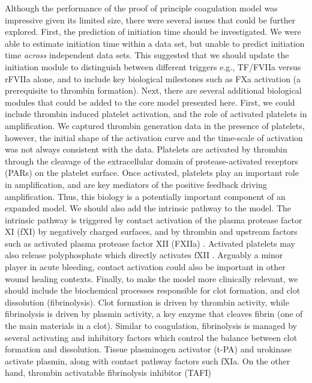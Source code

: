 \documentclass[12pt]{article}
\begin{document}
Although the performance of the proof of principle coagulation model was impressive given its limited size, there were several issues that could be further explored.
First, the prediction of initiation time should be investigated. 
We were able to estimate initiation time within a data set, but unable to predict initiation time \textit{across} independent data sets. 
This suggested that we should update the initiation module to distinguish between different triggers e.g., TF/FVIIa versus rFVIIa alone, 
and to include key biological milestones such as FXa activation (a prerequisite to thrombin formation).
Next, there are several additional biological modules that could be added to the core model presented here. 
First, we could include thrombin induced platelet activation, and the role of activated platelets in amplification.
We captured thrombin generation data in the presence of platelets, however,
the initial shape of the activation curve and the time-scale of activation was not always consistent with the data.
Platelets are activated by thrombin through the cleavage of the extracellular domain of protease-activated receptors (PARs) on the platelet surface.
Once activated, platelets play an important role in amplification, and are key mediators of the positive feedback driving amplification.
Thus, this biology is a potentially important component of an expanded model.
We should also add the intrinsic pathway to the model. 
The intrinsic pathway is triggered by contact activation of the plasma protease factor XI (fXI) by negatively charged surfaces, and by thrombin and upstream factors such as activated
plasma protease factor XII (FXIIa) \citep{NAITO1991,Gailani:1991aa}.
Activated platelets may also release polyphosphate which directly activates fXII \cite{Smith:2006zl}. 
Arguably a minor player in acute bleeding, contact activation could also be important in other wound healing contexts. 
Finally, to make the model more clinically relevant, we should include the biochemical processes responsible for clot formation, and clot dissolution (fibrinolysis).
Clot formation is driven by thrombin activity, while fibrinolysis is driven by plasmin activity, a key enzyme that cleaves fibrin (one of the main materials in a clot).
Similar to coagulation, fibrinolysis is managed by several activating and inhibitory factors which control the balance between clot formation and dissolution.
Tissue plasminogen activator (t-PA) and urokinase activate plasmin, along with contact pathway factors such fXIa. On the other hand, thrombin activatable fibrinolysis inhibitor (TAFI)
\end{document}
